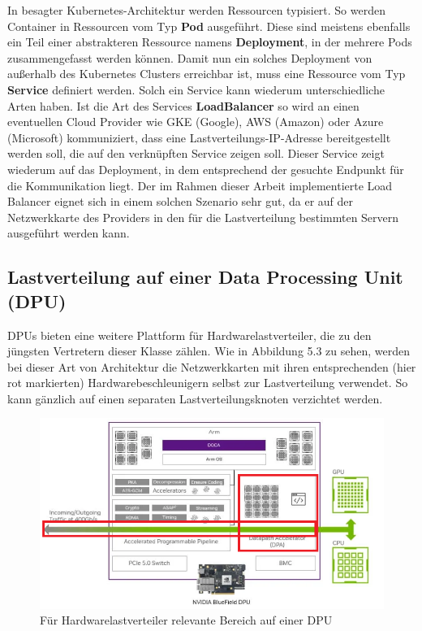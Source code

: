 In besagter Kubernetes-Architektur werden Ressourcen typisiert. So werden Container in Ressourcen vom Typ \textbf{Pod} ausgeführt. Diese sind meistens ebenfalls ein Teil einer abstrakteren Ressource namens \textbf{Deployment}, in der mehrere Pods zusammengefasst werden können. Damit nun ein solches Deployment von außerhalb des Kubernetes Clusters erreichbar ist, muss eine Ressource vom Typ \textbf{Service} definiert werden. Solch ein Service kann wiederum unterschiedliche Arten haben. Ist die Art des Services \textbf{LoadBalancer} so wird an einen eventuellen Cloud Provider wie GKE (Google), AWS (Amazon) oder Azure (Microsoft) kommuniziert, dass eine Lastverteilungs-IP-Adresse bereitgestellt werden soll, die auf den verknüpften Service zeigen soll. Dieser Service zeigt wiederum auf das Deployment, in dem entsprechend der gesuchte Endpunkt für die Kommunikation liegt. Der im Rahmen dieser Arbeit implementierte Load Balancer eignet sich in einem solchen Szenario sehr gut, da er auf der Netzwerkkarte des Providers in den für die Lastverteilung bestimmten Servern ausgeführt werden kann. 
\subsection{Lastverteilung auf einer Data Processing Unit (DPU)}
DPUs bieten eine weitere Plattform für Hardwarelastverteiler, die zu den jüngsten Vertretern dieser Klasse zählen. Wie in Abbildung 5.3 zu sehen, werden bei dieser Art von Architektur die Netzwerkkarten mit ihren entsprechenden (hier rot markierten) Hardwarebeschleunigern selbst zur Lastverteilung verwendet. So kann gänzlich auf einen separaten Lastverteilungsknoten verzichtet werden.
\begin{figure}
    \centering
    \includegraphics[width=0.7\linewidth]{images/nvda-bluefield-dpu-red.png}
    \caption{Für Hardwarelastverteiler relevante Bereich auf einer DPU \cite{fibermall_bluefield3}}
    \label{fig:enter-label}
\end{figure}